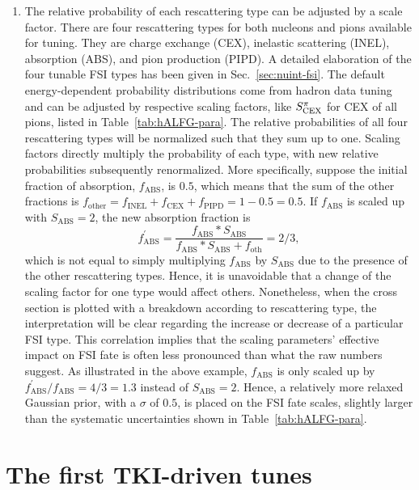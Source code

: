 \begin{enumerate}
    \item 
    The relative probability of each rescattering type can be adjusted by a scale factor. 
    There are four rescattering types for both nucleons and pions available for tuning. 
    They are charge exchange (CEX), inelastic scattering (INEL), absorption (ABS), and pion production (PIPD). 
    A detailed elaboration of the four tunable FSI types has been given in Sec.~\ref{sec:nuint-fsi}. 
    The default energy-dependent probability distributions come from hadron data tuning~\cite{LADS:1999dyv,Navon:1983xj,Carroll:1976hj,Clough:1974qt,BAUHOFF1986429} and can be adjusted by respective scaling factors, like $S_\textrm{CEX}^{\pi}$ for CEX of all pions, listed in Table~\ref{tab:hALFG-para}. 
    The relative probabilities of all four rescattering types will be normalized such that they sum up to one. 
    Scaling factors directly multiply the probability of each type, with new relative probabilities subsequently renormalized. 
    More specifically, suppose the initial fraction of absorption, $f_\textrm{ABS}$, is $0.5$, which means that the sum of the other fractions is  $f_\textrm{other}=f_\textrm{INEL}+f_\textrm{CEX}+f_\textrm{PIPD}=1-0.5=0.5$. 
    If $f_\textrm{ABS}$ is scaled up with $S_\textrm{ABS}=2$, the new absorption fraction is 
    \begin{equation}
        f^\prime_\textrm{ABS} = \frac{f_\textrm{ABS}*S_\textrm{ABS}}{f_\textrm{ABS}*S_\textrm{ABS}+f_\textrm{oth}} = 2/3,
    \end{equation}
    which is not equal to simply multiplying $f_\textrm{ABS}$ by $S_\textrm{ABS}$ due to the presence of the other rescattering types. 
    Hence, it is unavoidable that a change of the scaling factor for one type would affect others. 
    Nonetheless, when the cross section is plotted with a breakdown according to rescattering type, the interpretation will be clear regarding the increase or decrease of a particular FSI type. 
    This correlation implies that the scaling parameters' effective impact on FSI fate is often less pronounced than what the raw numbers suggest. 
    As illustrated in the above example, $f_\textrm{ABS}$ is only scaled up by $ f^\prime_\textrm{ABS}/f_\textrm{ABS}=4/3=1.3$ instead of $S_\textrm{ABS}=2$. 
    Hence, a relatively more relaxed Gaussian prior, with a $\sigma$ of $0.5$, is placed on the FSI fate scales, slightly larger than the systematic uncertainties shown in Table~\ref{tab:hALFG-para}. 
\end{enumerate}


\section{\label{sec:results}The first TKI-driven \genie tunes}

